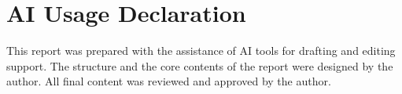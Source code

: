 \chapter{AI Usage Declaration}
This report was prepared with the assistance of AI tools 
for drafting and editing support. 
The structure and the core contents of the report were
designed by the author.
All final content was reviewed and approved 
by the author.
